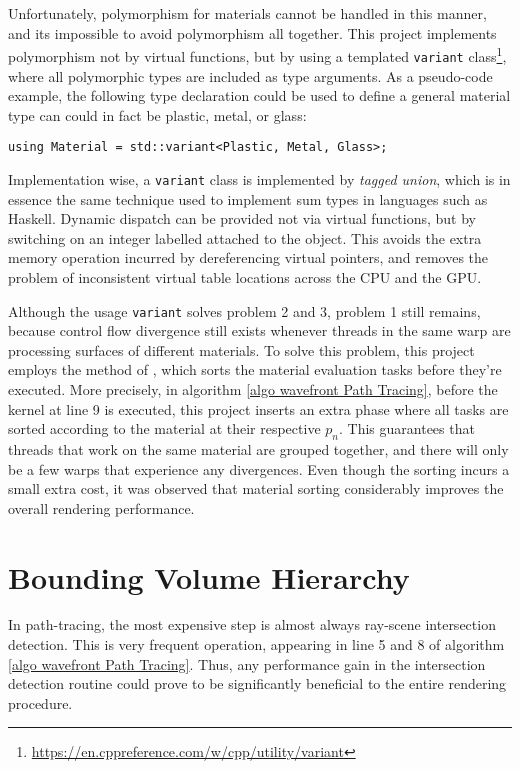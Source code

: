 Unfortunately, polymorphism for materials cannot be handled in this manner, and its impossible to avoid polymorphism all together. This project implements polymorphism not by virtual functions, but by using a templated \texttt{variant} class\footnote{\url{https://en.cppreference.com/w/cpp/utility/variant}}, where all polymorphic types are included as type arguments. As a pseudo-code example, the following type declaration could be used to define a general material type can could in fact be plastic, metal, or glass:
\begin{lstlisting}[style=cppStyle]
using Material = std::variant<Plastic, Metal, Glass>;
\end{lstlisting}

Implementation wise, a \texttt{variant} class is implemented by \textit{tagged union}, which is in essence the same technique used to implement sum types in languages such as Haskell. Dynamic dispatch can be provided not via virtual functions, but by switching on an integer labelled attached to the object. This avoids the extra memory operation incurred by dereferencing virtual pointers, and removes the problem of inconsistent virtual table locations across the CPU and the GPU.

Although the usage \texttt{variant} solves problem 2 and 3, problem 1 still remains, because control flow divergence still exists whenever threads in the same warp are processing surfaces of different materials. To solve this problem, this project employs the method of \cite{megakernel}, which sorts the material evaluation tasks before they're executed. More precisely, in algorithm \ref{algo wavefront Path Tracing}, before the kernel at line 9 is executed, this project inserts an extra phase where all tasks are sorted according to the material at their respective $p_n$. This guarantees that threads that work on the same material are grouped together, and there will only be a few warps that experience any divergences. Even though the sorting incurs a small extra cost, it was observed that material sorting considerably improves the overall rendering performance.

\newpage


\section{Bounding Volume Hierarchy}
In path-tracing, the most expensive step is almost always ray-scene intersection detection. This is very frequent operation, appearing in line 5 and 8 of algorithm \ref{algo wavefront Path Tracing}. Thus, any performance gain in the intersection detection routine could prove to be significantly beneficial to the entire rendering procedure. 

